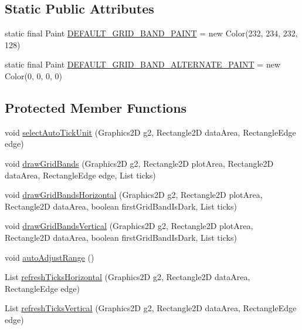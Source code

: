 \subsection*{Static Public Attributes}
\begin{DoxyCompactItemize}
\item 
static final Paint \mbox{\hyperlink{classorg_1_1jfree_1_1chart_1_1axis_1_1_symbol_axis_ac441cbd985b5f34d86bd8419ab8dc6d0}{D\+E\+F\+A\+U\+L\+T\+\_\+\+G\+R\+I\+D\+\_\+\+B\+A\+N\+D\+\_\+\+P\+A\+I\+NT}} = new Color(232, 234, 232, 128)
\item 
static final Paint \mbox{\hyperlink{classorg_1_1jfree_1_1chart_1_1axis_1_1_symbol_axis_ae93b2cc9f5791d1e9f62da2b1ecbf63d}{D\+E\+F\+A\+U\+L\+T\+\_\+\+G\+R\+I\+D\+\_\+\+B\+A\+N\+D\+\_\+\+A\+L\+T\+E\+R\+N\+A\+T\+E\+\_\+\+P\+A\+I\+NT}} = new Color(0, 0, 0, 0)
\end{DoxyCompactItemize}
\subsection*{Protected Member Functions}
\begin{DoxyCompactItemize}
\item 
void \mbox{\hyperlink{classorg_1_1jfree_1_1chart_1_1axis_1_1_symbol_axis_aab6da79a1b0995555f065af750b54ce7}{select\+Auto\+Tick\+Unit}} (Graphics2D g2, Rectangle2D data\+Area, Rectangle\+Edge edge)
\item 
void \mbox{\hyperlink{classorg_1_1jfree_1_1chart_1_1axis_1_1_symbol_axis_ab6050fbd448fa5795ab92c399f8e6776}{draw\+Grid\+Bands}} (Graphics2D g2, Rectangle2D plot\+Area, Rectangle2D data\+Area, Rectangle\+Edge edge, List ticks)
\item 
void \mbox{\hyperlink{classorg_1_1jfree_1_1chart_1_1axis_1_1_symbol_axis_ab8f4233fcb6f9b56cf3d0ab3a8b0d2c9}{draw\+Grid\+Bands\+Horizontal}} (Graphics2D g2, Rectangle2D plot\+Area, Rectangle2D data\+Area, boolean first\+Grid\+Band\+Is\+Dark, List ticks)
\item 
void \mbox{\hyperlink{classorg_1_1jfree_1_1chart_1_1axis_1_1_symbol_axis_a1091f5f2972337eacbfb98b635db17e1}{draw\+Grid\+Bands\+Vertical}} (Graphics2D g2, Rectangle2D plot\+Area, Rectangle2D data\+Area, boolean first\+Grid\+Band\+Is\+Dark, List ticks)
\item 
void \mbox{\hyperlink{classorg_1_1jfree_1_1chart_1_1axis_1_1_symbol_axis_ab10024e0bf1a48fcda4d362c04f28aa4}{auto\+Adjust\+Range}} ()
\item 
List \mbox{\hyperlink{classorg_1_1jfree_1_1chart_1_1axis_1_1_symbol_axis_a33fa67dae3e34a414e13316a417a5ab5}{refresh\+Ticks\+Horizontal}} (Graphics2D g2, Rectangle2D data\+Area, Rectangle\+Edge edge)
\item 
List \mbox{\hyperlink{classorg_1_1jfree_1_1chart_1_1axis_1_1_symbol_axis_a6a15c4d43feea4b2ed9e849506b0c62d}{refresh\+Ticks\+Vertical}} (Graphics2D g2, Rectangle2D data\+Area, Rectangle\+Edge edge)
\end{DoxyCompactItemize}
